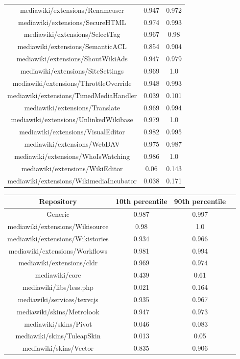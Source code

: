 \begin{table}[H]
\begin{tabular}{@{}c c c@{}}
mediawiki/extensions/Renameuser & 0.947 & 0.972 \\
mediawiki/extensions/SecureHTML & 0.974 & 0.993 \\
mediawiki/extensions/SelectTag & 0.967 & 0.98 \\
mediawiki/extensions/SemanticACL & 0.854 & 0.904 \\
mediawiki/extensions/ShoutWikiAds & 0.947 & 0.979 \\
mediawiki/extensions/SiteSettings & 0.969 & 1.0 \\
mediawiki/extensions/ThrottleOverride & 0.948 & 0.993 \\
mediawiki/extensions/TimedMediaHandler & 0.039 & 0.101 \\
mediawiki/extensions/Translate & 0.969 & 0.994 \\
mediawiki/extensions/UnlinkedWikibase & 0.979 & 1.0 \\
mediawiki/extensions/VisualEditor & 0.982 & 0.995 \\
mediawiki/extensions/WebDAV & 0.975 & 0.987 \\
mediawiki/extensions/WhoIsWatching & 0.986 & 1.0 \\
mediawiki/extensions/WikiEditor & 0.06 & 0.143 \\
mediawiki/extensions/WikimediaIncubator & 0.038 & 0.171 \\
    \hline
\end{tabular}
    \label{table:accuracy-score-repo-specific-and-generic-voted-appendix-c-part-4}
\end{table}

\begin{table}[H]
    \centering
    \begin{tabular}{@{}c c c c@{}} 
    \hline
    \textbf{Repository} & \textbf{10th percentile} & \textbf{90th percentile} \\
    \hline
    Generic & 0.987 & 0.997 \\
mediawiki/extensions/Wikisource & 0.98 & 1.0 \\
mediawiki/extensions/Wikistories & 0.934 & 0.966 \\
mediawiki/extensions/Workflows & 0.981 & 0.994 \\
mediawiki/extensions/cldr & 0.969 & 0.974 \\
mediawiki/core & 0.439 & 0.61 \\
mediawiki/libs/less.php & 0.021 & 0.164 \\
mediawiki/services/texvcjs & 0.935 & 0.967 \\
mediawiki/skins/Metrolook & 0.947 & 0.973 \\
mediawiki/skins/Pivot & 0.046 & 0.083 \\
mediawiki/skins/TuleapSkin & 0.013 & 0.05 \\
mediawiki/skins/Vector & 0.835 & 0.906 \\
    \hline
\end{tabular}
    \label{table:accuracy-score-repo-specific-and-generic-voted-appendix-c-part-5}
\end{table}

